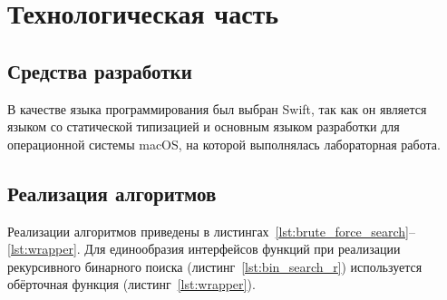 \chapter{Технологическая часть}
\section{Средства разработки}
В качестве языка программирования был выбран Swift, так как он является языком со статической типизацией и основным языком разработки для операционной системы macOS, на которой выполнялась лабораторная работа.
\section{Реализация алгоритмов}
Реализации алгоритмов приведены в листингах~\ref{lst:brute_force_search}--\ref{lst:wrapper}. Для единообразия интерфейсов функций при реализации рекурсивного бинарного поиска (листинг~\ref{lst:bin_search_r}) используется обёрточная функция (листинг~\ref{lst:wrapper}).

\noindent\begin{minipage}{\linewidth}

\end{minipage}

\noindent\begin{minipage}{\linewidth}

\end{minipage}

\noindent\begin{minipage}{\linewidth}

\end{minipage}

\noindent\begin{minipage}{\linewidth}

\end{minipage}

\noindent\begin{minipage}{\linewidth}

\end{minipage}


